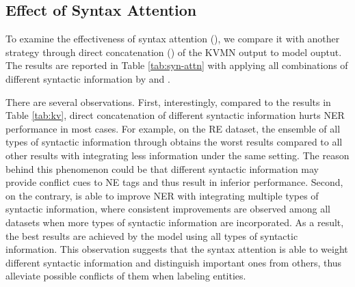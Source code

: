 \documentclass[11pt,a4paper]{article}
\begin{document}
\subsection{Effect of Syntax Attention}




To examine the effectiveness of syntax attention (), we compare 
it with another strategy through
direct concatenation () of the KVMN output to model ouptut.
The results are reported in
Table \ref{tab:syn-attn} with applying all combinations of different syntactic information by  and .



There are several observations.
First,
interestingly,
compared to the results in Table \ref{tab:kv},
direct concatenation of different syntactic information hurts NER performance in most cases.
For example, on the RE dataset, the ensemble of all types of syntactic information 
through  obtains the worst results compared to all other results with integrating less information under the same setting.
The reason behind this phenomenon could be that different syntactic information may provide conflict cues to NE tags and thus
result in inferior performance.
Second,
on the contrary,
 is able to improve NER with integrating multiple types of syntactic information,
where consistent improvements are observed among all datasets when more types of syntactic information are incorporated.
As a result, the best results are achieved by the model using all types of syntactic information. 
This observation suggests that 
the syntax attention is able to weight different syntactic information and distinguish important ones from others,
thus alleviate possible conflicts of them when labeling entities.
\end{document}
